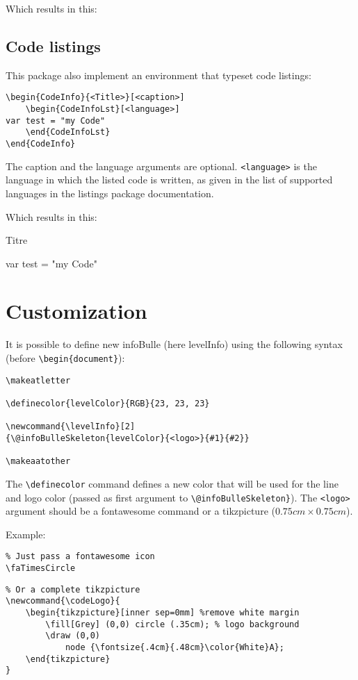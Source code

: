 \documentclass[a4paper, 11pt, oneside, fleqn]{article}
\begin{document}
Which results in this:

\subsection{Code listings}
This package also implement an environment that typeset code listings:
\begin{lstlisting}
\begin{CodeInfo}{<Title>}[<caption>]
	\begin{CodeInfoLst}[<language>]
var test = "my Code"
	\end{CodeInfoLst}
\end{CodeInfo}
\end{lstlisting}

The caption and the language arguments are optional. \verb|<language>| is the language in which the listed code is written, as given in the list of supported languages in the listings package documentation.

Which results in this:


\begin{CodeInfo}{Titre}
	\begin{CodeInfoLst}
var test = "my Code"
	\end{CodeInfoLst}
\end{CodeInfo}

\section{Customization}
It is possible to define new infoBulle (here levelInfo) using the following syntax (before \verb|\begin{document}|):

\begin{lstlisting}
\makeatletter

\definecolor{levelColor}{RGB}{23, 23, 23}

\newcommand{\levelInfo}[2]
{\@infoBulleSkeleton{levelColor}{<logo>}{#1}{#2}}

\makeaatother
\end{lstlisting}

The \verb|\definecolor| command defines a new color that will be used for the line and logo color (passed as first argument to \verb|\@infoBulleSkeleton}|). The \verb|<logo>| argument should be a fontawesome command or a tikzpicture ($0.75cm \times 0.75cm$).

Example:
\begin{lstlisting}
% Just pass a fontawesome icon
\faTimesCircle
\end{lstlisting}

\begin{lstlisting}
% Or a complete tikzpicture
\newcommand{\codeLogo}{
	\begin{tikzpicture}[inner sep=0mm] %remove white margin
		\fill[Grey] (0,0) circle (.35cm); % logo background
		\draw (0,0)
			node {\fontsize{.4cm}{.48cm}\color{White}A};
	\end{tikzpicture}
}
\end{lstlisting}
\end{document}
